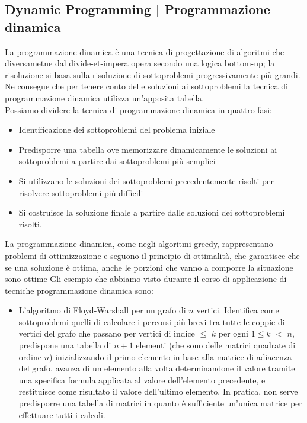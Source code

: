 \documentclass[11pt, oneside]{article}   	%
\begin{document}
\subsection{Dynamic Programming | Programmazione dinamica}
La programmazione dinamica è una tecnica di progettazione di algoritmi che diversametne dal divide-et-impera opera secondo una logica bottom-up; la risoluzione si basa sulla risoluzione di sottoproblemi progressivamente più grandi. Ne consegue che per tenere conto delle soluzioni ai sottoproblemi la tecnica di programmazione dinamica utilizza un'apposita tabella.\\
Possiamo dividere la tecnica di programmazione dinamica in quattro fasi:
\begin{itemize}
\item Identificazione dei sottoproblemi del problema iniziale
\item Predisporre una tabella ove memorizzare dinamicamente le soluzioni ai sottoproblemi a partire dai sottoproblemi più semplici
\item Si utilizzano le soluzioni dei sottoproblemi precedentemente risolti per risolvere sottoproblemi più difficili
\item Si costruisce la soluzione finale a partire dalle soluzioni dei sottoproblemi risolti.
\end{itemize}
La programmazione dinamica, come negli algoritmi greedy, rappresentano problemi di ottimizzazione e seguono il principio di ottimalità, che garantisce che se una soluzione è ottima, anche le porzioni che vanno a comporre la situazione sono ottime
Gli esempio che abbiamo visto durante il corso di applicazione di tecniche programmazione dinamica sono:
\begin{itemize}
\item L'algoritmo di Floyd-Warshall per un grafo di $n$ vertici.
Identifica come sottoproblemi quelli di calcolare i percorsi più brevi tra tutte le coppie di vertici del grafo che passano per vertici di indice $\leq$ $k$ per ogni $1 \leq k$ $<$ $n$, predispone una tabella di $n + 1$ elementi (che sono delle matrici quadrate di ordine $n$) inizializzando il primo elemento in base alla matrice di adiacenza del grafo, avanza di un elemento alla volta determinandone il valore tramite una specifica formula applicata al valore dell’elemento precedente, e restituisce come risultato il valore dell’ultimo elemento. In pratica, non serve predisporre una tabella di matrici in quanto è sufficiente un’unica matrice per effettuare tutti i calcoli.
\end{itemize}
\end{document}
